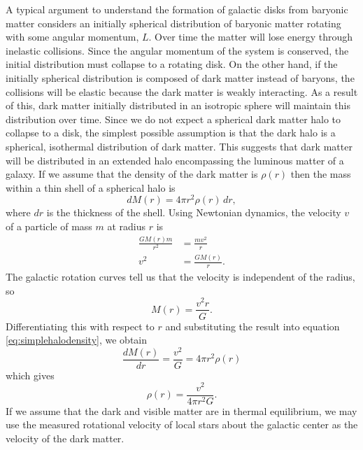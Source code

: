 A typical argument to understand the formation of galactic disks from baryonic
matter considers an initially spherical distribution of baryonic matter
rotating with some angular momentum, $L$. Over time the matter will lose
energy through inelastic collisions. Since the angular momentum of the system
is conserved, the initial distribution must collapse to a rotating disk.  On
the other hand, if the initially spherical distribution is composed of dark
matter instead of baryons, the collisions will be elastic because the dark
matter is weakly interacting. As a result of this, dark matter initially
distributed in an isotropic sphere will maintain this distribution over time.
Since we do not expect a spherical dark matter halo to collapse to a disk, the
simplest possible assumption is that the dark halo is a spherical, isothermal
distribution of dark matter. This suggests that dark matter will be
distributed in an extended halo encompassing the luminous matter of a galaxy.
If we assume that the density of the dark matter
is $\rho(r)$ then the mass within a thin shell of a spherical halo is
\begin{equation}
dM(r) = 4\pi r^2 \rho(r)\, dr,
\label{eq:simplehalodensity}
\end{equation}
where $dr$ is the thickness of the shell.
Using Newtonian dynamics, the velocity $v$ of a particle of mass $m$ at
radius $r$ is
\begin{equation}
\begin{split}
\frac{GM(r)m}{r^2} &= \frac{mv^2}{r} \\
v^2 &= \frac{GM(r)}{r}.
\end{split}
\end{equation}
The galactic rotation curves tell us that the velocity is independent of the
radius, so
\begin{equation}
M(r) = \frac{v^2r}{G}.
\end{equation}
Differentiating this with respect to $r$ and substituting the result into
equation \ref{eq:simplehalodensity}, we obtain
\begin{equation}
\frac{dM(r)}{dr} = \frac{v^2}{G} = 4\pi r^2\rho(r)
\end{equation}
which gives
\begin{equation}
\rho(r) = \frac{v^2}{4\pi r^2 G}.
\label{eq:simplehalodensity2}
\end{equation}
If we assume that the dark and visible matter are in thermal equilibrium, we
may use the measured rotational velocity of local stars about the galactic
center as the velocity of the dark matter. 

